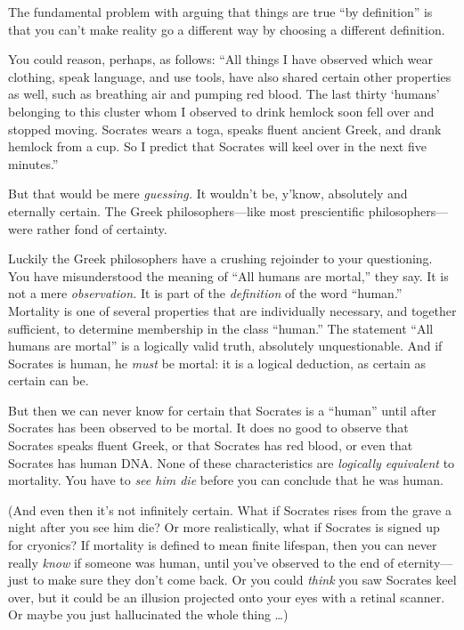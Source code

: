 {
 The fundamental problem with arguing that things are true
``by definition'' is that you
can't make reality go a different way by choosing a
different definition.}

{
 You could reason, perhaps, as follows: ``All
things I have observed which wear clothing, speak language, and use
tools, have also shared certain other properties as well, such as
breathing air and pumping red blood. The last thirty
`humans' belonging to this cluster whom
I observed to drink hemlock soon fell over and stopped moving. Socrates
wears a toga, speaks fluent ancient Greek, and drank hemlock from a
cup. So I predict that Socrates will keel over in the next five
minutes.''}

{
 But that would be mere \textit{guessing.} It
wouldn't be, y'know, absolutely and
eternally certain. The Greek philosophers---like most prescientific
philosophers---were rather fond of certainty.}

{
 Luckily the Greek philosophers have a crushing rejoinder to your
questioning. You have misunderstood the meaning of
``All humans are mortal,'' they say.
It is not a mere \textit{observation.} It is part of the
\textit{definition} of the word
``human.'' Mortality is one of
several properties that are individually necessary, and together
sufficient, to determine membership in the class
``human.'' The statement
``All humans are mortal'' is a
logically valid truth, absolutely unquestionable. And if Socrates is
human, he \textit{must} be mortal: it is a logical deduction, as
certain as certain can be.}

{
 But then we can never know for certain that Socrates is a
``human'' until after Socrates has
been observed to be mortal. It does no good to observe that Socrates
speaks fluent Greek, or that Socrates has red blood, or even that
Socrates has human DNA. None of these characteristics are
\textit{logically equivalent} to mortality. You have to \textit{see him
die} before you can conclude that he was human.}

{
 (And even then it's not infinitely certain. What
if Socrates rises from the grave a night after you see him die? Or more
realistically, what if Socrates is signed up for cryonics? If mortality
is defined to mean finite lifespan, then you can never really
\textit{know} if someone was human, until you've
observed to the end of eternity---just to make sure they
don't come back. Or you could \textit{think} you saw
Socrates keel over, but it could be an illusion projected onto your
eyes with a retinal scanner. Or maybe you just hallucinated the whole
thing \ldots)}

